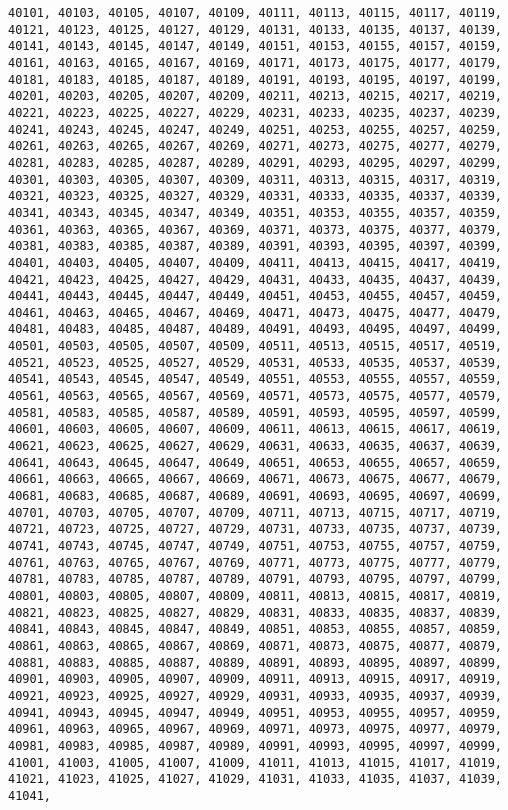 \documentclass[11pt]{article}
\begin{document}
\begin{Verbatim}[commandchars=\\\{\}]
40101, 40103, 40105, 40107, 40109, 40111, 40113, 40115, 40117, 40119, 40121, 40123, 40125, 40127, 40129, 40131, 40133, 40135, 40137, 40139, 40141, 40143, 40145, 40147, 40149, 40151, 40153, 40155, 40157, 40159, 40161, 40163, 40165, 40167, 40169, 40171, 40173, 40175, 40177, 40179, 40181, 40183, 40185, 40187, 40189, 40191, 40193, 40195, 40197, 40199, 40201, 40203, 40205, 40207, 40209, 40211, 40213, 40215, 40217, 40219, 40221, 40223, 40225, 40227, 40229, 40231, 40233, 40235, 40237, 40239, 40241, 40243, 40245, 40247, 40249, 40251, 40253, 40255, 40257, 40259, 40261, 40263, 40265, 40267, 40269, 40271, 40273, 40275, 40277, 40279, 40281, 40283, 40285, 40287, 40289, 40291, 40293, 40295, 40297, 40299, 40301, 40303, 40305, 40307, 40309, 40311, 40313, 40315, 40317, 40319, 40321, 40323, 40325, 40327, 40329, 40331, 40333, 40335, 40337, 40339, 40341, 40343, 40345, 40347, 40349, 40351, 40353, 40355, 40357, 40359, 40361, 40363, 40365, 40367, 40369, 40371, 40373, 40375, 40377, 40379, 40381, 40383, 40385, 40387, 40389, 40391, 40393, 40395, 40397, 40399, 40401, 40403, 40405, 40407, 40409, 40411, 40413, 40415, 40417, 40419, 40421, 40423, 40425, 40427, 40429, 40431, 40433, 40435, 40437, 40439, 40441, 40443, 40445, 40447, 40449, 40451, 40453, 40455, 40457, 40459, 40461, 40463, 40465, 40467, 40469, 40471, 40473, 40475, 40477, 40479, 40481, 40483, 40485, 40487, 40489, 40491, 40493, 40495, 40497, 40499, 40501, 40503, 40505, 40507, 40509, 40511, 40513, 40515, 40517, 40519, 40521, 40523, 40525, 40527, 40529, 40531, 40533, 40535, 40537, 40539, 40541, 40543, 40545, 40547, 40549, 40551, 40553, 40555, 40557, 40559, 40561, 40563, 40565, 40567, 40569, 40571, 40573, 40575, 40577, 40579, 40581, 40583, 40585, 40587, 40589, 40591, 40593, 40595, 40597, 40599, 40601, 40603, 40605, 40607, 40609, 40611, 40613, 40615, 40617, 40619, 40621, 40623, 40625, 40627, 40629, 40631, 40633, 40635, 40637, 40639, 40641, 40643, 40645, 40647, 40649, 40651, 40653, 40655, 40657, 40659, 40661, 40663, 40665, 40667, 40669, 40671, 40673, 40675, 40677, 40679, 40681, 40683, 40685, 40687, 40689, 40691, 40693, 40695, 40697, 40699, 40701, 40703, 40705, 40707, 40709, 40711, 40713, 40715, 40717, 40719, 40721, 40723, 40725, 40727, 40729, 40731, 40733, 40735, 40737, 40739, 40741, 40743, 40745, 40747, 40749, 40751, 40753, 40755, 40757, 40759, 40761, 40763, 40765, 40767, 40769, 40771, 40773, 40775, 40777, 40779, 40781, 40783, 40785, 40787, 40789, 40791, 40793, 40795, 40797, 40799, 40801, 40803, 40805, 40807, 40809, 40811, 40813, 40815, 40817, 40819, 40821, 40823, 40825, 40827, 40829, 40831, 40833, 40835, 40837, 40839, 40841, 40843, 40845, 40847, 40849, 40851, 40853, 40855, 40857, 40859, 40861, 40863, 40865, 40867, 40869, 40871, 40873, 40875, 40877, 40879, 40881, 40883, 40885, 40887, 40889, 40891, 40893, 40895, 40897, 40899, 40901, 40903, 40905, 40907, 40909, 40911, 40913, 40915, 40917, 40919, 40921, 40923, 40925, 40927, 40929, 40931, 40933, 40935, 40937, 40939, 40941, 40943, 40945, 40947, 40949, 40951, 40953, 40955, 40957, 40959, 40961, 40963, 40965, 40967, 40969, 40971, 40973, 40975, 40977, 40979, 40981, 40983, 40985, 40987, 40989, 40991, 40993, 40995, 40997, 40999, 41001, 41003, 41005, 41007, 41009, 41011, 41013, 41015, 41017, 41019, 41021, 41023, 41025, 41027, 41029, 41031, 41033, 41035, 41037, 41039, 41041, 
\end{Verbatim}
\end{document}
